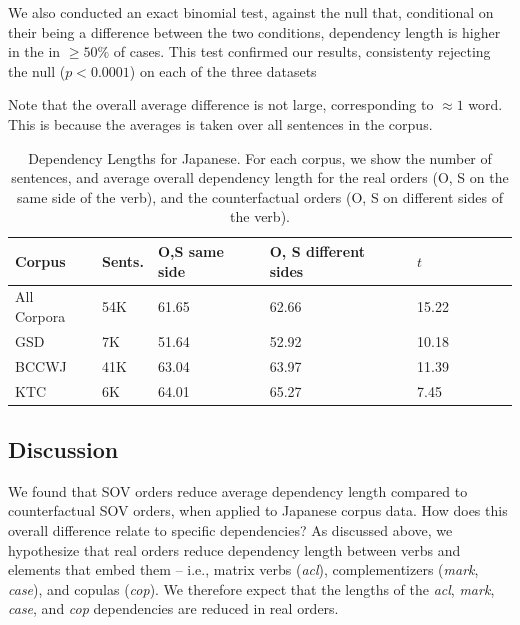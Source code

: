 \documentclass[11pt,a4paper]{article}
\begin{document}
We also conducted an exact binomial test, against the null that, conditional on their being a difference between the two conditions, dependency length is higher in the in  $\geq 50\%$ of cases.
This test confirmed our results, consistenty rejecting the null ($p < 0.0001$) on each of the three datasets

Note that the overall average difference is not large, corresponding to $\approx 1$ word.
This is because the averages is taken over all sentences in the corpus.

 

\begin{table}
\begin{center}
\begin{tabular}{l|l|lllllll}
 Corpus                   &   Sents.                     & O,S same side   & O, S different sides  & $t$   \\ \hline\hline
All Corpora     &  54K     & 61.65 & 62.66 &   15.22   \\ \hline
GSD             &   7K       & 51.64 &  52.92  &  10.18  \\
BCCWJ           &   41K       &    63.04   & 63.97 &  11.39  \\
KTC             &   6K   &  64.01 & 65.27 &  7.45\\ \hline
\end{tabular}
\end{center}
\caption{Dependency Lengths for Japanese. For each corpus, we show the number of sentences, and average overall dependency length for the real orders (O, S on the same side of the verb), and the counterfactual orders (O, S on different sides of the verb).}\label{tab:depl-resu}
\end{table}



\subsection{Discussion}
We found that SOV orders reduce average dependency length compared to counterfactual SOV orders, when applied to Japanese corpus data.
How does this overall difference relate to specific dependencies? 
As discussed above, we hypothesize that real orders reduce dependency length between verbs and elements that embed them -- i.e., matrix verbs (\emph{acl}), complementizers (\emph{mark}, \emph{case}), and copulas (\emph{cop}).
We therefore expect that the lengths of the \emph{acl}, \emph{mark}, \emph{case}, and \emph{cop} dependencies are reduced in real orders.
\end{document}
